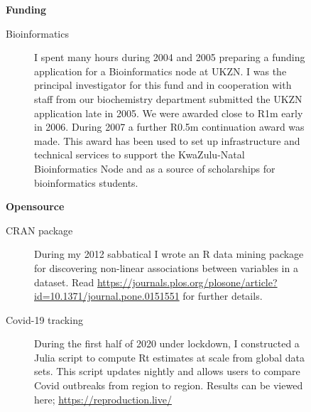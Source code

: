           
 \begin{description}\item[] \begin{description}\item[] {\large \bf  Funding }
\begin{description}
 \item[ Bioinformatics     ]  
          I spent many hours during 2004 and 2005 preparing
          a funding application for a
          Bioinformatics node at UKZN. 
          I was the principal investigator
          for this fund and in cooperation
          with staff from our biochemistry department
          submitted the UKZN application
          late in 2005.
          We were awarded close to R1m early in 2006.
          During 2007 a further R0.5m continuation award was made.
          This award has been used to set up infrastructure and technical
          services to support the KwaZulu-Natal Bioinformatics Node and
          as a source of scholarships for bioinformatics students.
          
\end{description}
\end{description}
\end{description}
          
\begin{description}\item[] \begin{description}\item[] {\large \bf  Opensource }
\begin{description}
\item[ CRAN package ]
	During my 2012 sabbatical I wrote an R data mining package for discovering
	non-linear associations between variables in a dataset. Read 
	\url{https://journals.plos.org/plosone/article?id=10.1371/journal.pone.0151551}       
	for further details.
\item[ Covid-19 tracking ]
	During the first half of 2020 under lockdown, I constructed a Julia script
	to compute Rt estimates at scale from global data sets. This script updates
	nightly and allows users to compare Covid outbreaks from region to region.
	Results can be viewed here; \url{https://reproduction.live/}
\end{description}
\end{description}
\end{description}

